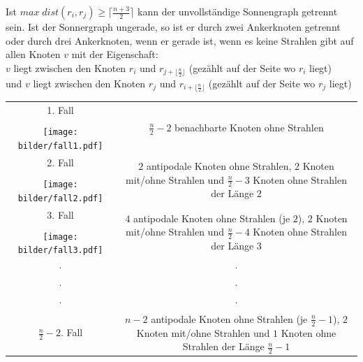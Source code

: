 \begin{lem}
Ist $max\;dist(r_i,r_j)\geq \lceil \frac{n+3}{2}\rceil$ kann der unvollständige Sonnengraph getrennt sein. Ist der Sonnergraph ungerade, so ist er durch zwei Ankerknoten getrennt oder durch drei Ankerknoten, wenn er gerade ist, wenn es keine Strahlen gibt auf allen Knoten $v$ mit der Eigenschaft:\\
$v$ liegt zwischen den Knoten $r_i$ und $r_{j+\lfloor\frac{n}{2}\rfloor}$ (gezählt auf der Seite wo $r_i$ liegt) \\und $v$ liegt zwischen den Knoten $r_j$ und $r_{i+\lfloor\frac{n}{2}\rfloor}$ (gezählt auf der Seite wo $r_j$ liegt)
\end{lem}
\begin{table}[htp]
\centering
 \renewcommand{\arraystretch}{2}
\begin{tabularx}{\textwidth}{||c|c||}
\hline\hline
\vspace{0.3mm}
1. Fall& \multirow{3}{121mm}{$\frac{n}{2}-2$ benachbarte Knoten ohne Strahlen}\\
\cline{1-1}
\vspace{-6mm}
&\\
	\texttt{[image: bilder/fall1.pdf]}&\\
\hline\hline
\vspace{0.3mm}
2. Fall&\multirow{3}{121mm}{$2$ antipodale Knoten ohne Strahlen, $2$ Knoten mit/ohne Strahlen und $\frac{n}{2}-3$ Knoten ohne Strahlen der Länge $2$}\\
\cline{1-1}
\vspace{-6mm}&\\
\texttt{[image: bilder/fall2.pdf]}&\\
\hline\hline
\vspace{0.3mm}
3. Fall&\multirow{3}{121mm}{ $4$ antipodale Knoten ohne Strahlen (je $2$), $2$ Knoten mit/ohne Strahlen und $\frac{n}{2}-4$ Knoten ohne Strahlen der Länge $3$}\\
\cline{1-1}
\vspace{-6mm}&\\
\texttt{[image: bilder/fall3.pdf]}&\\
\hline\hline
$\cdot$ &  $\cdot$\\
$\cdot$ &  $\cdot$\\
$\cdot$ &  $\cdot$\\
\hline\hline
\vspace{0.3mm}
$\frac{n}{2}-2$. Fall&\multirow{3}{121mm}{$n-2$ antipodale Knoten ohne Strahlen (je $\frac{n}{2}-1$), $2$ Knoten mit/ohne Strahlen und $1$ Knoten ohne Strahlen der Länge $\frac{n}{2}-1$}\\

\end{tabularx}
\end{table}

